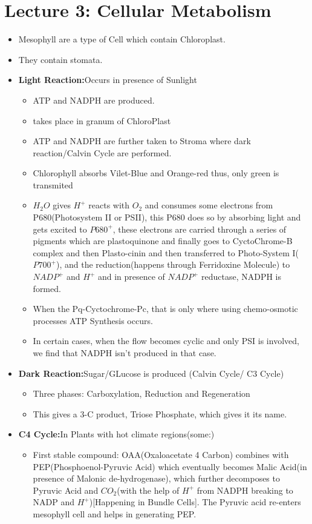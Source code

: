\documentclass{article}
\begin{document}
\section{Lecture 3: Cellular Metabolism}
\begin{itemize}
  \item Mesophyll are a type of Cell which contain Chloroplast.
  \item They contain stomata.
  \item \textbf{Light Reaction:}Occurs in presence of Sunlight
  \begin{itemize}
    \item ATP and NADPH are produced.
    \item takes place in granum of ChloroPlast
    \item ATP and NADPH are further taken to Stroma where dark reaction/Calvin Cycle are performed.
    \item Chlorophyll absorbs Vilet-Blue and Orange-red thus, only green is transmited
    \item $H_2O$ gives $H^{+}$ reacts with $O_2$ and consumes some electrons from P680(Photosystem II or PSII), this P680 does so by absorbing light and gets excited to $P680^{+}$, these electrons are carried through a series of pigments which are plastoquinone and finally goes to CyctoChrome-B complex and then Plasto-cinin and then transferred to Photo-System I($P700^{+}$), and the reduction(happens through Ferridoxine Molecule) to $NADP^{+}$ and $H^{+}$ and in presence of $NADP^{+}$ reductase, NADPH is formed.
    \item When the Pq-Cyctochrome-Pc, that is only where using chemo-osmotic processes ATP Synthesis occurs.

    \item In certain cases, when the flow becomes cyclic and only PSI is involved, we find that NADPH isn't produced in that case.
  \end{itemize}
  \item \textbf{Dark Reaction:}Sugar/GLucose is produced (Calvin Cycle/ C3 Cycle)
  \begin{itemize}
    \item Three phases: Carboxylation, Reduction and Regeneration
    \item This gives a 3-C product, Triose Phosphate, which gives it its name.
  \end{itemize}
  \item \textbf{C4 Cycle:}In Plants with hot climate regions(some:)
  \begin{itemize}
    \item First stable compound: OAA(Oxaloacetate 4 Carbon) combines with PEP(Phosphoenol-Pyruvic Acid) which eventually becomes Malic Acid(in presence of Malonic de-hydrogenase), which further decomposes to Pyruvic Acid and $CO_2$(with the help of $H^{+}$ from NADPH breaking to NADP and $H^{+}$)[Happening in Bundle Cells].
    The Pyruvic acid re-enters mesophyll cell and helps in generating PEP.


\end{itemize}
\end{itemize}
\end{document}
